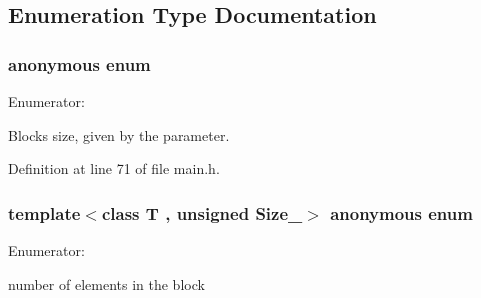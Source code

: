 \subsection{Enumeration Type Documentation}
\hypertarget{group__mnglayer_gd7fa741aa0ccf5fb9b7b0085669864d3}{
\subsubsection[{"@2}]{\setlength{\rightskip}{0pt plus 5cm}anonymous enum}}
\label{group__mnglayer_gd7fa741aa0ccf5fb9b7b0085669864d3}


\begin{Desc}
\item[Enumerator: ]\par
\begin{description}
\item[{\em 
\hypertarget{group__mnglayer_ggd7fa741aa0ccf5fb9b7b0085669864d3955b5433f4e53a6b37036545e6af766f}{
t\_\-size}
\label{group__mnglayer_ggd7fa741aa0ccf5fb9b7b0085669864d3955b5433f4e53a6b37036545e6af766f}
}]Blocks size, given by the parameter. \end{description}
\end{Desc}



Definition at line 71 of file main.h.\hypertarget{group__mnglayer_g2c6c9f26f6ba7bd45841bb125b90e04f}{
\subsubsection[{"@3}]{\setlength{\rightskip}{0pt plus 5cm}template$<$class T , unsigned Size\_\-$>$ anonymous enum}}
\label{group__mnglayer_g2c6c9f26f6ba7bd45841bb125b90e04f}


\begin{Desc}
\item[Enumerator: ]\par
\begin{description}
\item[{\em 
\hypertarget{group__mnglayer_gg2c6c9f26f6ba7bd45841bb125b90e04f5fdb4b66f1c64a4b69f23756713341f2}{
size}
\label{group__mnglayer_gg2c6c9f26f6ba7bd45841bb125b90e04f5fdb4b66f1c64a4b69f23756713341f2}
}]number of elements in the block \end{description}
\end{Desc}



